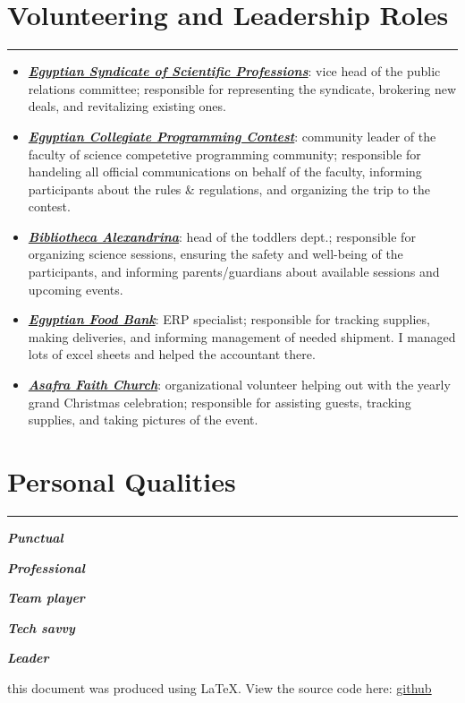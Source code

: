 \documentclass[10pt]{article}
\newcommand{\fancy}[1]{\Large\textbf{\textit{#1}}}
\begin{document}

\section*{Volunteering and Leadership Roles}
\hrule
\vspace{1em}
\begin{itemize}
	\item \fancy{\href{https://www.linkedin.com/company/syndicate-of-scientific-professions-alexandria-نقابة-المهن-العلمية-الإسكندرية/}{Egyptian Syndicate of Scientific Professions}}: vice head of the public relations committee; responsible for representing the syndicate, brokering new deals, and revitalizing existing ones.
	\item \fancy{\href{https://www.linkedin.com/showcase/ecpc-egyptian-collegiate-programming-contest1/}{Egyptian Collegiate Programming Contest}}: community leader of the faculty of science competetive programming community; responsible for handeling all official communications on behalf of the faculty, informing participants about the rules \& regulations, and organizing the trip to the contest.
	\item \fancy{\href{https://www.linkedin.com/company/bibalexofficial/}{Bibliotheca Alexandrina}}: head of the toddlers dept.; responsible for organizing science sessions, ensuring the safety and well-being of the participants, and informing parents/guardians about available sessions and upcoming events.
	\item \fancy{\href{https://www.linkedin.com/company/egyptian-food-bank/}{Egyptian Food Bank}}: ERP specialist; responsible for tracking supplies, making deliveries, and informing management of needed shipment. I managed lots of excel sheets and helped the accountant there.
	\item \fancy{\href{https://www.linkedin.com/company/asafra-faith-church/}{Asafra Faith Church}}: organizational volunteer helping out with the yearly grand Christmas celebration; responsible for assisting guests, tracking supplies, and taking pictures of the event.
\end{itemize}

\section*{Personal Qualities}
\hrule
\vspace{1em}
\begin{itemize*}
\item \fancy{Punctual \quad\quad}
\item \fancy{Professional \quad\quad}
\item \fancy{Team player \quad\quad}
\item \fancy{Tech savvy \quad\quad}
\item \fancy{Leader}
\end{itemize*}

\begin{center}
	{\tiny this document was produced using \LaTeX. View the source code here: \href{https://github.com/aaamw2000/myLaTeX/tree/main/pii/myCV}{github}}
\end{center}
\end{document}
